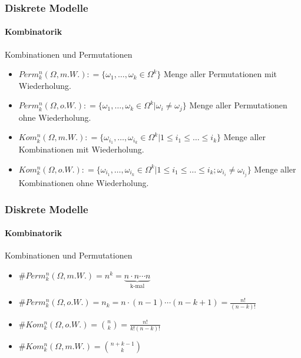 \documentclass{beamer}
\begin{document}
\begin{frame}
    \frametitle{Diskrete Modelle}
\framesubtitle{Kombinatorik}

\begin{block}{Kombinationen und Permutationen}
\begin{itemize}
\item $Perm_k^n(\Omega, m.W.) : = \{ \omega_1, \ldots, \omega_k \in \Omega^k \}$  Menge aller Permutationen mit Wiederholung.
\item $Perm_k^n(\Omega, o.W.) : = \{ \omega_1, \ldots, \omega_k \in \Omega^k  | \omega_i \neq \omega_j\}$  Menge aller Permutationen ohne Wiederholung.
\item $Kom_k^n(\Omega, m.W.) : = \{ \omega_{i_1}, \ldots, \omega_{i_k} \in \Omega^k  | 1  \leq i_1 \leq  \ldots  \leq i_k \}$  Menge aller Kombinationen  mit Wiederholung.
\item $Kom_k^n(\Omega, o.W.) : = \{ \omega_{i_1}, \ldots, \omega_{i_k} \in \Omega^k  | 1 \leq i_1  \leq \ldots \leq i_k ;  \omega_{i_i} \neq \omega_{i_j} \}$  Menge aller Kombinationen  ohne  Wiederholung.
\end{itemize}
\end{block}
 \end{frame}



\begin{frame}
    \frametitle{Diskrete Modelle}
\framesubtitle{Kombinatorik}

\begin{block}{Kombinationen und Permutationen}
\begin{itemize}
\item $\# Perm_k^n(\Omega, m.W.)  = n^k = \underbrace{n \cdot n \cdots n}_{\text{k-mal}}$
\item $\# Perm_k^n(\Omega, o.W.)  = n_k = n \cdot (n-1) \cdots  (n-k+1) = \frac{n!}{(n-k)!}$  
\item $\#Kom_k^n(\Omega, o.W.) = \binom{n}{k} = \frac{n!}{k! (n-k)!}$  
\item $\#Kom_k^n(\Omega, m.W.)  = \binom{n + k -1}{k}$  
\end{itemize}
\end{block}
 \end{frame}
\end{document}
